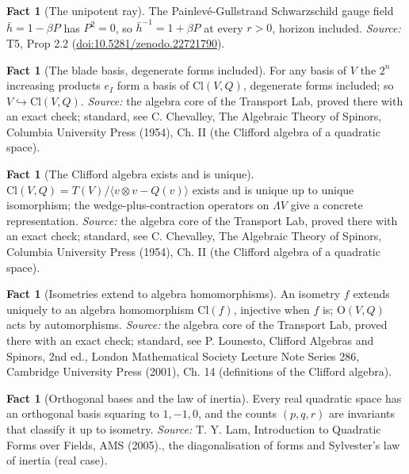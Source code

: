 \documentclass[11pt]{article}
\theoremstyle{definition}
\newtheorem{fact}[theorem]{Fact}
\theoremstyle{plain}
\providecommand{\Cl}{}\renewcommand{\Cl}{\mathrm{Cl}}
\providecommand{\hb}{}\renewcommand{\hb}{\bar{h}}
\begin{document}
\begin{fact}[The unipotent ray]\label{c:singularity.unipotent-ray}
The Painlev\'e-Gullstrand Schwarzschild gauge field $\hb = 1 - \beta P$ has $P^2 = 0$, so $\hb^{-1} = 1 + \beta P$ at every $r > 0$, horizon included.
\emph{Source:} T5, Prop 2.2 (\href{https://doi.org/10.5281/zenodo.22721790}{doi:10.5281/zenodo.22721790}).
\end{fact}

\begin{fact}[The blade basis, degenerate forms included]\label{c:std-algebra.blade-basis}
For any basis of $V$ the $2^{n}$ increasing products $e_I$ form a basis of $\Cl(V, Q)$, degenerate forms included; so $V \hookrightarrow \Cl(V, Q)$.
\emph{Source:} the algebra core of the Transport Lab, proved there with an exact check; standard, see C. Chevalley, The Algebraic Theory of Spinors, Columbia University Press (1954), Ch. II (the Clifford algebra of a quadratic space).
\end{fact}

\begin{fact}[The Clifford algebra exists and is unique]\label{c:std-algebra.existence-uniqueness}
$\Cl(V, Q) = T(V)/\langle v \otimes v - Q(v) \rangle$ exists and is unique up to unique isomorphism; the wedge-plus-contraction operators on $\Lambda V$ give a concrete representation.
\emph{Source:} the algebra core of the Transport Lab, proved there with an exact check; standard, see C. Chevalley, The Algebraic Theory of Spinors, Columbia University Press (1954), Ch. II (the Clifford algebra of a quadratic space).
\end{fact}

\begin{fact}[Isometries extend to algebra homomorphisms]\label{c:std-algebra.functoriality}
An isometry $f$ extends uniquely to an algebra homomorphism $\Cl(f)$, injective when $f$ is; $\mathrm{O}(V, Q)$ acts by automorphisms.
\emph{Source:} the algebra core of the Transport Lab, proved there with an exact check; standard, see P. Lounesto, Clifford Algebras and Spinors, 2nd ed., London Mathematical Society Lecture Note Series 286, Cambridge University Press (2001), Ch. 14 (definitions of the Clifford algebra).
\end{fact}

\begin{fact}[Orthogonal bases and the law of inertia]\label{c:std-algebra.sylvester-inertia}
Every real quadratic space has an orthogonal basis squaring to $1, -1, 0$, and the counts $(p, q, r)$ are invariants that classify it up to isometry.
\emph{Source:} T. Y. Lam, Introduction to Quadratic Forms over Fields, AMS (2005)., the diagonalisation of forms and Sylvester's law of inertia (real case).
\end{fact}
\end{document}
